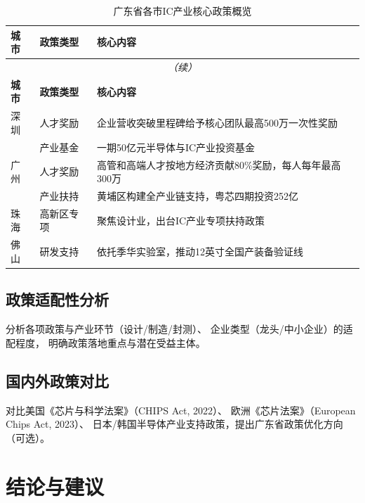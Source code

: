 \documentclass[12pt,a4paper]{ctexart}
\newcommand{\tableHeaderRow}{\rowcolor{tealPrimary}\color{white}}
\newcommand{\tableOddRow}{\rowcolor{mintBG}}
\newcommand{\tableEvenRow}{\rowcolor{white}}
\begin{document}
\begin{longtable}{llp{5cm}}
\caption{广东省各市IC产业核心政策概览} \\
\toprule
\tableHeaderRow
\textbf{城市} & \textbf{政策类型} & \textbf{核心内容} \\
\midrule
\endfirsthead
\multicolumn{3}{c}{\textit{（续）}} \\
\toprule
\tableHeaderRow
\textbf{城市} & \textbf{政策类型} & \textbf{核心内容} \\
\midrule
\endhead
\bottomrule
\endfoot
\tableOddRow  深圳 & 人才奖励 & 企业营收突破里程碑给予核心团队最高500万一次性奖励 \\
\tableEvenRow      & 产业基金 & 一期50亿元半导体与IC产业投资基金 \\
\tableOddRow  广州 & 人才奖励 & 高管和高端人才按地方经济贡献80\%奖励，每人每年最高300万 \\
\tableEvenRow      & 产业扶持 & 黄埔区构建全产业链支持，粤芯四期投资252亿 \\
\tableOddRow  珠海 & 高新区专项 & 聚焦设计业，出台IC产业专项扶持政策 \\
\tableEvenRow 佛山 & 研发支持 & 依托季华实验室，推动12英寸全国产装备验证线 \\
\bottomrule
\end{longtable}

\subsection{政策适配性分析}
\label{sec:policy_fit}

分析各项政策与产业环节（设计/制造/封测）、
企业类型（龙头/中小企业）的适配程度，
明确政策落地重点与潜在受益主体。

\subsection{国内外政策对比}
\label{sec:policy_comparison}

对比美国《芯片与科学法案》（CHIPS Act, 2022）、
欧洲《芯片法案》（European Chips Act, 2023）、
日本/韩国半导体产业支持政策，提出广东省政策优化方向（可选）。

\section{结论与建议}
\label{sec:conclusion}
\end{document}
